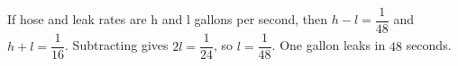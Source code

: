 If hose and leak rates are h and l gallons per second, then $h-l=\dfrac{1}{48}$ and $h+l=\dfrac{1}{16}$. Subtracting gives $2l=\dfrac{1}{24}$, so $l=\dfrac{1}{48}$. One gallon leaks in $\boxed{48}$ seconds.
